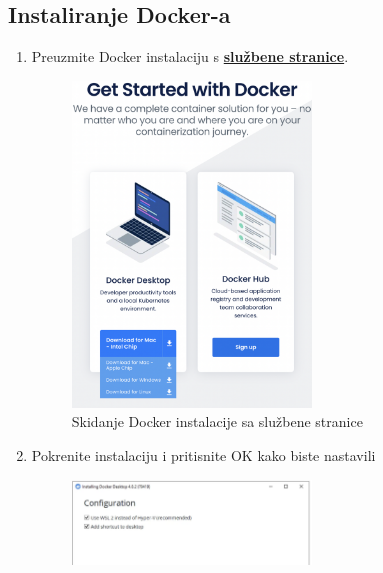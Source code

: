 		\subsection*{Instaliranje Docker-a}
		\begin{enumerate}
			\item Preuzmite Docker instalaciju s \textbf{\href{https://docs.docker.com/get-docker/}{službene stranice}}.
			\begin{figure}[h]
				\centering
				\includegraphics[width=0.6\textwidth]{slike/docker_install/0.png}
				\caption{Skidanje Docker instalacije sa službene stranice}
			\end{figure}
			\newpage
			\item Pokrenite instalaciju i pritisnite OK kako biste nastavili
			\begin{figure}[h]
				\centering
				\includegraphics[width=0.6\textwidth]{slike/docker_install/2.png}
				

\end{figure}
\end{enumerate}
